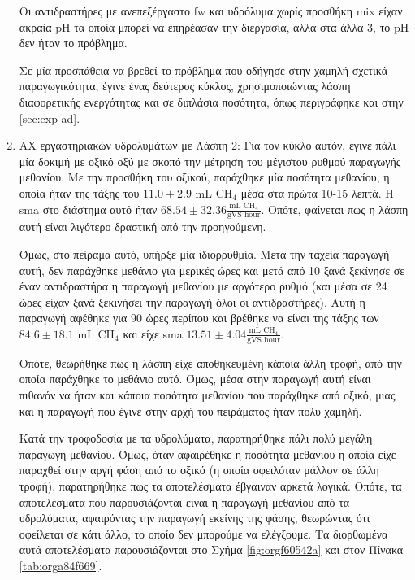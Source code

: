 \documentclass[11pt]{report}
\begin{document}
\begin{enumerate}
Οι αντιδραστήρες με ανεπεξέργαστο \acrshort{fw} και υδρόλυμα χωρίς προσθήκη \acrshort{mix} είχαν ακραία pH τα οποία μπορεί να επηρέασαν την διεργασία, αλλά στα άλλα 3, το pH δεν ήταν το πρόβλημα.

Σε μία προσπάθεια να βρεθεί το πρόβλημα που οδήγησε στην χαμηλή σχετικά παραγωγικότητα, έγινε ένας δεύτερος κύκλος, χρησιμοποιώντας λάσπη διαφορετικής ενεργότητας και σε διπλάσια ποσότητα, όπως περιγράφηκε και στην \autoref{sec:exp-ad}.

\item ΑΧ εργαστηριακών υδρολυμάτων με Λάσπη 2:
\label{sec:orgf88bdb6}
Για τον κύκλο αυτόν, έγινε πάλι μία δοκιμή με οξικό οξύ με σκοπό την μέτρηση του μέγιστου ρυθμού παραγωγής μεθανίου. Με την προσθήκη του οξικού, παράχθηκε μία ποσότητα μεθανίου, η οποία ήταν της τάξης του \(11.0 \pm 2.9 \text{ mL CH$_4$}\) μέσα στα πρώτα 10-15 λεπτά. H \acrshort{sma} στο διάστημα αυτό ήταν \(68.54 \pm 32.36 \frac{\text{mL CH$_4$}}{\text{gVS hour}}\). Οπότε, φαίνεται πως η λάσπη αυτή είναι λιγότερο δραστική από την προηγούμενη.

Όμως, στο πείραμα αυτό, υπήρξε μία ιδιορρυθμία. Μετά την ταχεία παραγωγή αυτή, δεν παράχθηκε μεθάνιο για μερικές ώρες και μετά από 10 ξανά ξεκίνησε σε έναν αντιδραστήρα η παραγωγή μεθανίου με αργότερο ρυθμό (και μέσα σε 24 ώρες είχαν ξανά ξεκινήσει την παραγωγή όλοι οι αντιδραστήρες). Αυτή η παραγωγή αφέθηκε για 90 ώρες περίπου και βρέθηκε να είναι της τάξης των \(84.6 \pm 18.1 \text{ mL CH$_4$}\) και είχε \acrshort{sma} \(13.51 \pm 4.04 \frac{\text{mL CH$_4$}}{\text{gVS hour}}\).

Οπότε, θεωρήθηκε πως η λάσπη είχε αποθηκευμένη κάποια άλλη τροφή, από την οποία παράχθηκε το μεθάνιο αυτό. Όμως, μέσα στην παραγωγή αυτή είναι πιθανόν να ήταν και κάποια ποσότητα μεθανίου που παράχθηκε από οξικό, μιας και η παραγωγή που έγινε στην αρχή του πειράματος ήταν πολύ χαμηλή.

Κατά την τροφοδοσία με τα υδρολύματα, παρατηρήθηκε πάλι πολύ μεγάλη παραγωγή μεθανίου. Όμως, όταν αφαιρέθηκε η ποσότητα μεθανίου η οποία είχε παραχθεί στην αργή φάση από το οξικό (η οποία οφειλόταν μάλλον σε άλλη τροφή), παρατηρήθηκε πως τα αποτελέσματα έβγαιναν αρκετά λογικά. Οπότε, τα αποτελέσματα που παρουσιάζονται είναι η παραγωγή μεθανίου από τα υδρολύματα, αφαιρόντας την παραγωγή εκείνης της φάσης, θεωρώντας ότι οφείλεται σε κάτι άλλο, το οποίο δεν μπορούμε να ελέγξουμε. Τα διορθωμένα αυτά αποτελέσματα παρουσιάζονται στο Σχήμα \ref{fig:orgf60542a} και στον Πίνακα \ref{tab:orga84f669}.


\end{enumerate}
\end{document}
